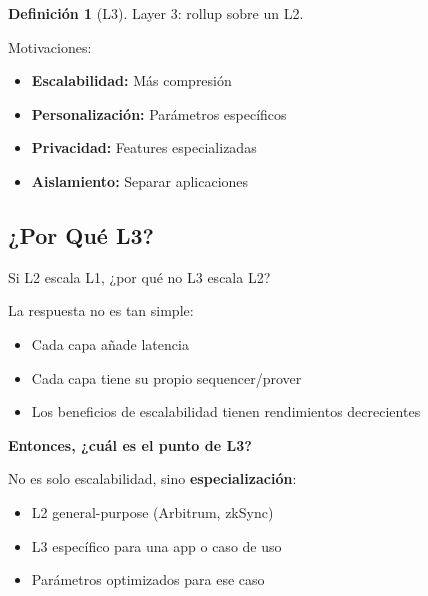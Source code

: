 \documentclass[11pt,a4paper,twoside,openright]{book}
\theoremstyle{definition}
\newtheorem{definition}{Definición}[chapter]
\theoremstyle{plain}
\theoremstyle{remark}
\begin{document}
\begin{definition}[L3]
Layer 3: rollup sobre un L2.
\end{definition}

Motivaciones:
\begin{itemize}
    \item \textbf{Escalabilidad:} Más compresión
    \item \textbf{Personalización:} Parámetros específicos
    \item \textbf{Privacidad:} Features especializadas
    \item \textbf{Aislamiento:} Separar aplicaciones
\end{itemize}

\subsection{¿Por Qué L3?}

\begin{intuicion}
Si L2 escala L1, ¿por qué no L3 escala L2?

La respuesta no es tan simple:
\begin{itemize}
    \item Cada capa añade latencia
    \item Cada capa tiene su propio sequencer/prover
    \item Los beneficios de escalabilidad tienen rendimientos decrecientes
\end{itemize}

\textbf{Entonces, ¿cuál es el punto de L3?}

No es solo escalabilidad, sino \textbf{especialización}:
\begin{itemize}
    \item L2 general-purpose (Arbitrum, zkSync)
    \item L3 específico para una app o caso de uso
    \item Parámetros optimizados para ese caso
\end{itemize}
\end{intuicion}
\end{document}
